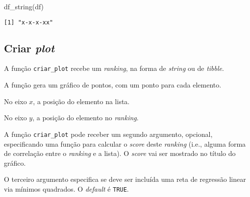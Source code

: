 \documentclass[
  letterpaper,
  DIV=11,
  numbers=noendperiod]{scrreprt}
\newenvironment{Shaded}{\begin{snugshade}}{\end{snugshade}}
\newcommand{\FunctionTok}[1]{\textcolor[rgb]{0.28,0.35,0.67}{#1}}
\newcommand{\NormalTok}[1]{\textcolor[rgb]{0.00,0.23,0.31}{#1}}
\begin{document}
\begin{Shaded}
\begin{Highlighting}[]
\FunctionTok{df\_string}\NormalTok{(df)}
\end{Highlighting}
\end{Shaded}

\begin{verbatim}
[1] "x-x-x-xx"
\end{verbatim}

\subsection{\texorpdfstring{Criar
\emph{plot}}{Criar plot}}\label{criar-plot}

A função \texttt{criar\_plot} recebe um \emph{ranking}, na forma de
\emph{string} ou de \emph{tibble}.

A função gera um gráfico de pontos, com um ponto para cada elemento.

No eixo $x$, a posição do elemento na lista.

No eixo $y$, a posição do elemento no \emph{ranking}.

A função \texttt{criar\_plot} pode receber um segundo argumento,
opcional, especificando uma função para calcular o \emph{score} deste
\emph{ranking} (i.e., alguma forma de correlação entre o \emph{ranking}
e a lista). O \emph{score} vai ser mostrado no título do gráfico.

O terceiro argumento especifica se deve ser incluída uma reta de
regressão linear via mínimos quadrados. O \emph{default} é
\texttt{TRUE}.
\end{document}
